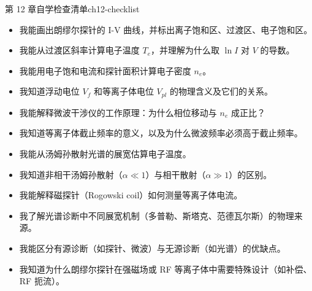 \begin{checklistbox}{第 12 章自学检查清单}{ch12-checklist}
\begin{itemize}[leftmargin=*,label=$\square$]
\item[$\square$] 我能画出朗缪尔探针的 I-V 曲线，并标出离子饱和区、过渡区、电子饱和区。
\item[$\square$] 我能从过渡区斜率计算电子温度 $T_e$，并理解为什么取 $\ln I$ 对 $V$ 的导数。
\item[$\square$] 我能用电子饱和电流和探针面积计算电子密度 $n_e$。
\item[$\square$] 我知道浮动电位 $V_f$ 和等离子体电位 $V_{pl}$ 的物理含义及它们的关系。
\item[$\square$] 我能解释微波干涉仪的工作原理：为什么相位移动与 $n_e$ 成正比？
\item[$\square$] 我知道等离子体截止频率的意义，以及为什么微波频率必须高于截止频率。
\item[$\square$] 我能从汤姆孙散射光谱的展宽估算电子温度。
\item[$\square$] 我知道非相干汤姆孙散射（$\alpha \ll 1$）与相干散射（$\alpha \gg 1$）的区别。
\item[$\square$] 我能解释磁探针（Rogowski coil）如何测量等离子体电流。
\item[$\square$] 我了解光谱诊断中不同展宽机制（多普勒、斯塔克、范德瓦尔斯）的物理来源。
\item[$\square$] 我能区分有源诊断（如探针、微波）与无源诊断（如光谱）的优缺点。
\item[$\square$] 我知道为什么朗缪尔探针在强磁场或 RF 等离子体中需要特殊设计（如补偿、RF 扼流）。
\end{itemize}
\end{checklistbox}


\endinput
